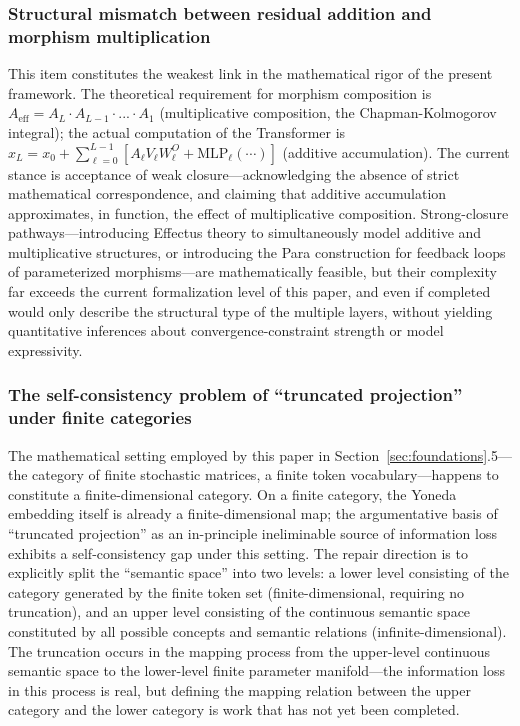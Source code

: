 \documentclass[11pt,a4paper]{article}
\theoremstyle{definition}
\begin{document}
\subsubsection{Structural mismatch between residual addition and morphism multiplication}

This item constitutes the weakest link in the mathematical rigor of the present framework. The theoretical requirement for morphism composition is $A_{\text{eff}} = A_L \cdot A_{L-1} \cdot ... \cdot A_1$ (multiplicative composition, the Chapman-Kolmogorov integral); the actual computation of the Transformer is $x_L = x_0 + \sum_{\ell=0}^{L-1} [A_\ell V_\ell W_\ell^O + \text{MLP}_\ell(\cdots)]$ (additive accumulation). The current stance is acceptance of weak closure---acknowledging the absence of strict mathematical correspondence, and claiming that additive accumulation approximates, in function, the effect of multiplicative composition. Strong-closure pathways---introducing Effectus theory\cite{cho2015effectus} to simultaneously model additive and multiplicative structures, or introducing the Para construction\cite{fong2019para} for feedback loops of parameterized morphisms---are mathematically feasible, but their complexity far exceeds the current formalization level of this paper, and even if completed would only describe the structural type of the multiple layers, without yielding quantitative inferences about convergence-constraint strength or model expressivity.

\subsubsection{The self-consistency problem of ``truncated projection'' under finite categories}

The mathematical setting employed by this paper in Section~\ref{sec:foundations}.5---the category of finite stochastic matrices, a finite token vocabulary---happens to constitute a finite-dimensional category. On a finite category, the Yoneda embedding itself is already a finite-dimensional map; the argumentative basis of ``truncated projection'' as an in-principle ineliminable source of information loss exhibits a self-consistency gap under this setting. The repair direction is to explicitly split the ``semantic space'' into two levels: a lower level consisting of the category generated by the finite token set (finite-dimensional, requiring no truncation), and an upper level consisting of the continuous semantic space constituted by all possible concepts and semantic relations (infinite-dimensional). The truncation occurs in the mapping process from the upper-level continuous semantic space to the lower-level finite parameter manifold---the information loss in this process is real, but defining the mapping relation between the upper category and the lower category is work that has not yet been completed.
\end{document}
